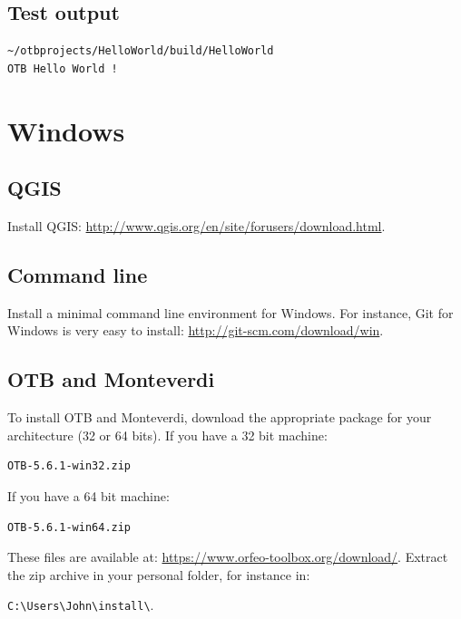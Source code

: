\documentclass[10pt,a4paper]{article}
\begin{document}
\subsection{Test output}

\begin{verbatim}
~/otbprojects/HelloWorld/build/HelloWorld
OTB Hello World !
\end{verbatim}

\section{Windows}


\subsection{QGIS}
Install QGIS: \url{http://www.qgis.org/en/site/forusers/download.html}.

\subsection{Command line}
Install a minimal command line environment for Windows. For instance, Git for Windows is very easy to install:
\url{http://git-scm.com/download/win}.

\subsection{OTB and Monteverdi}
To install OTB and Monteverdi, download the appropriate package for your architecture (32 or 64 bits). If you have a 32 bit machine:

\begin{verbatim}
OTB-5.6.1-win32.zip
\end{verbatim}

If you have a 64 bit machine:

\begin{verbatim}
OTB-5.6.1-win64.zip
\end{verbatim}

These files are available at:
\url{https://www.orfeo-toolbox.org/download/}.
Extract the zip archive in your personal folder, for instance in:\\
\begin{centering}
\texttt{C:{\textbackslash}Users{\textbackslash}John{\textbackslash}install{\textbackslash}}.
\end{centering}
\end{document}
